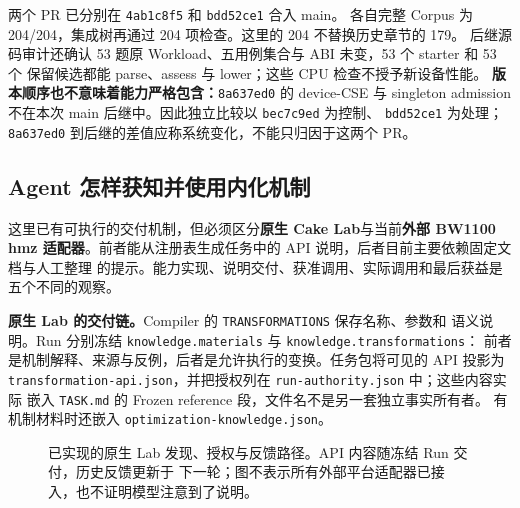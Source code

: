 \documentclass[UTF8,11pt,a4paper,fontset=none]{ctexart}
\newcommand{\code}[1]{\texttt{#1}}
\begin{document}
两个 PR 已分别在 \code{4ab1c8f5} 和 \code{bdd52ce1} 合入 main。
各自完整 Corpus 为 204/204，集成树再通过 204 项检查。这里的 204 不替换历史章节的 179。
后继源码审计还确认 53 题原 Workload、五用例集合与 ABI 未变，53 个 starter 和 53 个
保留候选都能 parse、assess 与 lower；这些 CPU 检查不授予新设备性能。
\textbf{版本顺序也不意味着能力严格包含：}\code{8a637ed0} 的 device-CSE 与 singleton
admission 不在本次 main 后继中。因此独立比较以 \code{bec7c9ed} 为控制、
\code{bdd52ce1} 为处理；\code{8a637ed0} 到后继的差值应称系统变化，不能只归因于这两个 PR。


\subsection{Agent 怎样获知并使用内化机制}\label{sec:agent-transform-discovery}

这里已有可执行的交付机制，但必须区分\textbf{原生 Cake Lab}与当前\textbf{外部 BW1100
hmz 适配器}。前者能从注册表生成任务中的 API 说明，后者目前主要依赖固定文档与人工整理
的提示。能力实现、说明交付、获准调用、实际调用和最后获益是五个不同的观察。

\textbf{原生 Lab 的交付链。}Compiler 的 \code{TRANSFORMATIONS} 保存名称、参数和
语义说明。Run 分别冻结 \code{knowledge.materials} 与 \code{knowledge.transformations}：
前者是机制解释、来源与反例，后者是允许执行的变换。任务包将可见的 API 投影为
\code{transformation-api.json}，并把授权列在 \code{run-authority.json} 中；这些内容实际
嵌入 \code{TASK.md} 的 Frozen reference 段，文件名不是另一套独立事实所有者。
有机制材料时还嵌入 \code{optimization-knowledge.json}\cite{bwagentdelivery}。

\begin{figure}[htbp]
\centering
{}
\caption{已实现的原生 Lab 发现、授权与反馈路径。API 内容随冻结 Run 交付，历史反馈更新于
下一轮；图不表示所有外部平台适配器已接入，也不证明模型注意到了说明。}
\end{figure}
\end{document}
